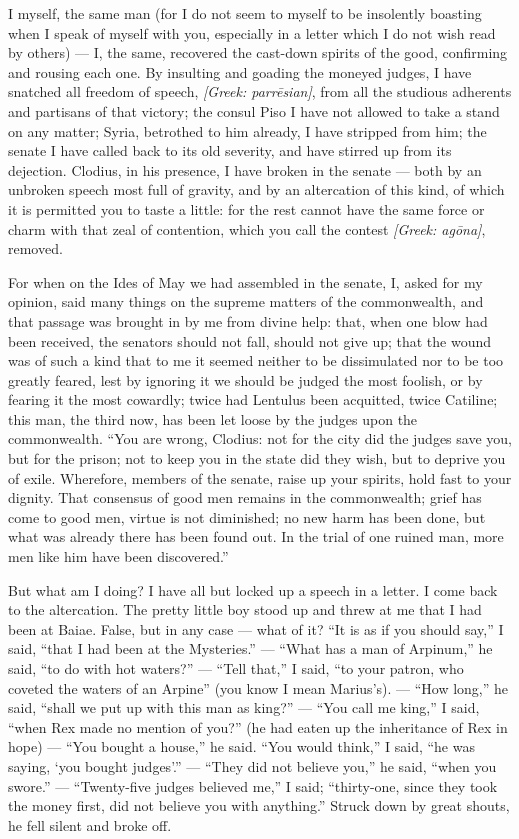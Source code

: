  I myself, the same man (for I do not seem to myself to be insolently boasting when I speak of myself with you, especially in a letter which I do not wish read by others) --- I, the same, recovered the cast-down spirits of the good, confirming and rousing each one. By insulting and goading the moneyed judges, I have snatched all freedom of speech, \textit{[Greek: parr\=esian]}, from all the studious adherents and partisans of that victory; the consul Piso I have not allowed to take a stand on any matter; Syria, betrothed to him already, I have stripped from him; the senate I have called back to its old severity, and have stirred up from its dejection. Clodius, in his presence, I have broken in the senate --- both by an unbroken speech most full of gravity, and by an altercation of this kind, of which it is permitted you to taste a little: for the rest cannot have the same force or charm with that zeal of contention, which you call the contest \textit{[Greek: ag\=ona]}, removed.

 For when on the Ides of May we had assembled in the senate, I, asked for my opinion, said many things on the supreme matters of the commonwealth, and that passage was brought in by me from divine help: that, when one blow had been received, the senators should not fall, should not give up; that the wound was of such a kind that to me it seemed neither to be dissimulated nor to be too greatly feared, lest by ignoring it we should be judged the most foolish, or by fearing it the most cowardly; twice had Lentulus been acquitted, twice Catiline; this man, the third now, has been let loose by the judges upon the commonwealth. ``You are wrong, Clodius: not for the city did the judges save you, but for the prison; not to keep you in the state did they wish, but to deprive you of exile. Wherefore, members of the senate, raise up your spirits, hold fast to your dignity. That consensus of good men remains in the commonwealth; grief has come to good men, virtue is not diminished; no new harm has been done, but what was already there has been found out. In the trial of one ruined man, more men like him have been discovered.''

 But what am I doing? I have all but locked up a speech in a letter. I come back to the altercation. The pretty little boy stood up and threw at me that I had been at Baiae. False, but in any case --- what of it? ``It is as if you should say,'' I said, ``that I had been at the Mysteries.'' --- ``What has a man of Arpinum,'' he said, ``to do with hot waters?'' --- ``Tell that,'' I said, ``to your patron, who coveted the waters of an Arpine'' (you know I mean Marius's). --- ``How long,'' he said, ``shall we put up with this man as king?'' --- ``You call me king,'' I said, ``when Rex made no mention of you?'' (he had eaten up the inheritance of Rex in hope) --- ``You bought a house,'' he said. ``You would think,'' I said, ``he was saying, `you bought judges'.'' --- ``They did not believe you,'' he said, ``when you swore.'' --- ``Twenty-five judges believed me,'' I said; ``thirty-one, since they took the money first, did not believe you with anything.'' Struck down by great shouts, he fell silent and broke off.

